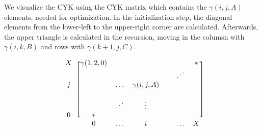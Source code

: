 We visualize the CYK using the CYK matrix which contains the \(\gamma(i,j,A)\)
elements, needed for optimization.  In the initialization step, the diagonal
elements from the lower-left to the upper-right corner are calculated.
Afterwards, the upper triangle is calculated in the recursion, moving in the
columsn with \(\gamma(i,k,B)\) and rows with \(\gamma(k+1,j,C)\).

\newcommand{\udots}{\reflectbox{$\ddots$}}
\[
\begin{blockarray}{ccccccc}
\begin{block}{c[cccccc]}
X      & \gamma(1,2,0) &        &   &               &        & * \\
       &        &        &   &               & \udots &   \\
j      &        & \hdots & \gamma(i,j,A)  &               &        &  \\
       &        &        &   &               &        &  \\
       &        & \udots & \vdots &               &        &  \\
0      & *      &        &   &               &        &  \\
\end{block}
       & 0      & \hdots & i &               & \hdots & X
\end{blockarray}
\]



